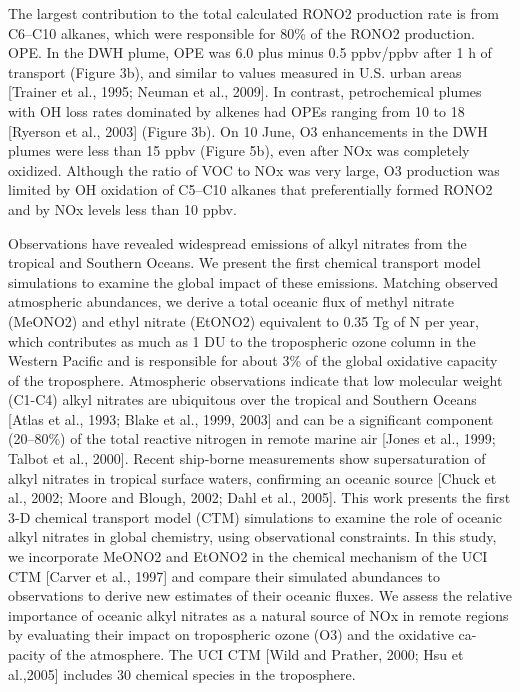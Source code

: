 \documentclass[11pt,a4paper]{article}
\begin{document}
The largest contribution to the total calculated RONO2 production rate is from C6–C10 alkanes, which were responsible for 80\% of the RONO2 production.
OPE. In the DWH plume, OPE was 6.0 plus minus 0.5 ppbv/ppbv after 1 h of transport (Figure 3b), and similar to values measured in U.S. urban areas [Trainer et al., 1995; Neuman et al., 2009]. In contrast, petrochemical plumes with OH loss rates dominated by alkenes had OPEs ranging from 10 to 18 [Ryerson et al., 2003] (Figure 3b). On 10 June, O3 enhancements in the DWH plumes were less than 15 ppbv (Figure 5b), even after NOx was completely oxidized. Although the ratio of VOC to NOx was very large, O3 production was limited by OH oxidation of C5–C10 alkanes that preferentially formed RONO2 and by NOx levels less than 10 ppbv.

\citep{Neu2008}
Observations have revealed widespread emissions of alkyl nitrates from the tropical and Southern Oceans. We present the first chemical transport model simulations to examine the global impact of these emissions. Matching observed atmospheric abundances, we derive a total oceanic flux of methyl nitrate (MeONO2) and ethyl nitrate (EtONO2) equivalent to 0.35 Tg of N per year, which contributes as much as 1 DU to the tropospheric ozone column in the Western Pacific and is responsible for about 3\% of the global oxidative capacity of the troposphere.
Atmospheric observations indicate that low molecular weight (C1-C4) alkyl nitrates are ubiquitous over the tropical and Southern Oceans [Atlas et al., 1993; Blake et al., 1999, 2003] and can be a significant component (20–80\%) of the total reactive nitrogen in remote marine air [Jones et al., 1999; Talbot et al., 2000]. Recent ship-borne measurements show supersaturation of alkyl nitrates in tropical surface waters, confirming an oceanic source [Chuck et al., 2002; Moore and Blough, 2002; Dahl et al., 2005]. This work presents the first 3-D chemical transport model (CTM) simulations to examine the role of oceanic alkyl nitrates in global chemistry, using observational constraints.
In this study, we incorporate MeONO2 and EtONO2 in the chemical mechanism of the UCI CTM [Carver et al., 1997] and compare their simulated abundances to observations to derive new estimates of their oceanic fluxes. We assess the relative importance of oceanic alkyl nitrates as a natural source of NOx in remote regions by evaluating their impact on tropospheric ozone (O3) and the oxidative ca- pacity of the atmosphere.
The UCI CTM [Wild and Prather, 2000; Hsu et al.,2005] includes 30 chemical species in the troposphere.
\end{document}
